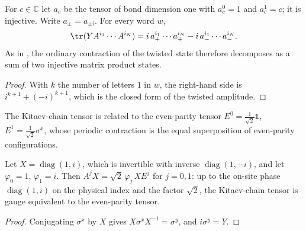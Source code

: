 \begin{lemma}%
    \label{thm:kitaev_two_injective}
    \leanok
    For $c\in\mathbb C$ let $a_c$ be the tensor of bond dimension one with
    $a_c^0=1$ and $a_c^1=c$; it is injective. Write $a_\pm=a_{\pm i}$. For
    every word $w$,
    \begin{align}
        \tr(YA^{i_1}\cdots A^{i_N})
        =
        i\,a_+^{i_1}\cdots a_+^{i_N}
        -i\,a_-^{i_1}\cdots a_-^{i_N}.
        \label{eq:kitaev_sum_two_injective}
    \end{align}
    As in \cite[Section~III.A.4]{Cirac2021Matrix}, the ordinary contraction of
    the twisted state therefore decomposes as a sum of two injective matrix
    product states.
\end{lemma}

\begin{proof}
    \leanok
    With $k$ the number of letters $1$ in $w$, the right-hand side is
    $i^{k+1}+(-i)^{k+1}$, which is the closed form of the twisted amplitude.
\end{proof}

The Kitaev-chain tensor is related to the even-parity tensor
$E^0=\tfrac1{\sqrt2}\mathbb 1$, $E^1=\tfrac1{\sqrt2}\sigma^x$, whose periodic
contraction is the equal superposition of even-parity configurations.

\begin{lemma}\label{lem:kitaev_even_parity_bridge}
    \leanok
    Let $X=\operatorname{diag}(1,i)$, which is invertible with inverse
    $\operatorname{diag}(1,-i)$, and let $\varphi_0=1$, $\varphi_1=i$. Then
    $A^jX=\sqrt2\,\varphi_j\,XE^j$ for $j=0,1$: up to the on-site phase
    $\operatorname{diag}(1,i)$ on the physical index and the factor $\sqrt2$,
    the Kitaev-chain tensor is gauge equivalent to the even-parity tensor.
\end{lemma}

\begin{proof}
    \leanok
    Conjugating $\sigma^x$ by $X$ gives $X\sigma^xX^{-1}=\sigma^y$, and
    $i\sigma^y=Y$.
\end{proof}
